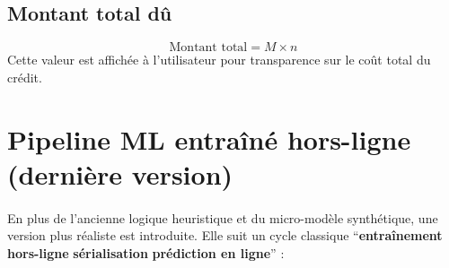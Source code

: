 \documentclass[12pt,a4paper]{report}
\begin{document}
\subsection{Montant total dû}
\[
\text{Montant total} = M \times n
\]
Cette valeur est affichée à l'utilisateur pour transparence sur le coût total du crédit.

\section{Pipeline ML entraîné hors-ligne (dernière version)}
\paragraph{}En plus de l'ancienne logique heuristique et du micro-modèle synthétique, une version plus réaliste est introduite. Elle suit un cycle classique “\textbf{entraînement hors-ligne} \textrightarrow{} \textbf{sérialisation} \textrightarrow{} \textbf{prédiction en ligne}” :
\end{document}
